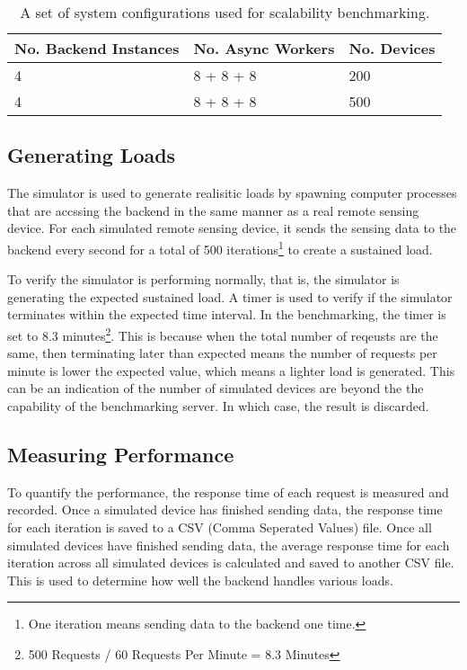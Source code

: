 \documentclass[../thesis.tex]{subfiles}
\begin{document}
\begin{table}[h!]
	\begin{center}
		\caption{A set of system configurations used for scalability benchmarking.}
		\label{tab:scalebench}
		\begin{tabular}{l|l|l}
			\toprule
			\textbf{No. Backend Instances} & \textbf{No. Async Workers} & \textbf{No. Devices}\\
			\midrule
			4 & 8 + 8 + 8 & 200\\
			4 & 8 + 8 + 8 & 500\\
			\bottomrule
		\end{tabular}
	\end{center}
\end{table}

\subsection{Generating Loads}

The simulator is used to generate realisitic loads by spawning computer processes that are accssing the backend in the same manner as a real remote sensing device. For each simulated remote sensing device, it sends the sensing data to the backend every second for a total of 500 iterations\footnote{One iteration means sending data to the backend one time.} to create a sustained load. 

To verify the simulator is performing normally, that is, the simulator is generating the expected sustained load. A timer is used to verify if the simulator terminates within the expected time interval. In the benchmarking, the timer is set to 8.3 minutes\footnote{500 Requests / 60 Requests Per Minute = 8.3 Minutes}. This is because when the total number of reqeusts are the same, then terminating later than expected means the number of requests per minute is lower the expected value, which means a lighter load is generated. This can be an indication of the number of simulated devices are beyond the the capability of the benchmarking server. In which case, the result is discarded. 


\subsection{Measuring Performance}

To quantify the performance, the response time of each request is measured and recorded. Once a simulated device has finished sending data, the response time for each iteration is saved to a CSV (Comma Seperated Values) file. Once all simulated devices have finished sending data, the average response time for each iteration across all simulated devices is calculated and saved to another CSV file. This is used to determine how well the backend handles various loads.
\end{document}
